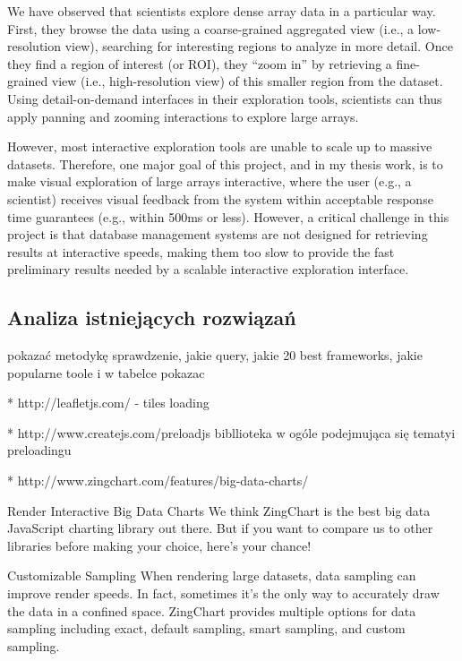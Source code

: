 We have observed that scientists explore dense array data in a particular way. First, they browse the data using a coarse-grained aggregated view (i.e., a low-resolution view), searching for interesting regions to analyze in more detail. Once they find a region of interest (or ROI), they “zoom in” by retrieving a fine-grained view (i.e., high-resolution view) of this smaller region from the dataset. Using detail-on-demand interfaces in their exploration tools, scientists can thus apply panning and zooming interactions to explore large arrays.

However, most interactive exploration tools are unable to scale up to massive datasets. Therefore, one major goal of this project, and in my thesis work, is to make visual exploration of large arrays interactive, where the user (e.g., a scientist) receives visual feedback from the system within acceptable response time guarantees (e.g., within 500ms or less). However, a critical challenge in this project is that database management systems are not designed for retrieving results at interactive speeds, making them too slow to provide the fast preliminary results needed by a scalable interactive exploration interface.



\subsection{Analiza istniejących rozwiązań}

pokazać metodykę sprawdzenie, jakie query, jakie 20 best frameworks, jakie popularne toole i w tabelce pokazac

* http://leafletjs.com/ - tiles loading

* http://www.createjs.com/preloadjs
bibllioteka w ogóle podejmująca się tematyi preloadingu

* http://www.zingchart.com/features/big-data-charts/

 Render Interactive Big Data Charts
 We think ZingChart is the best big data JavaScript charting library out there. But if you want to compare us to other libraries before making your choice, here’s your chance!

Customizable Sampling
When rendering large datasets, data sampling can improve render speeds. In fact, sometimes it's the only way to accurately draw the data in a confined space. ZingChart provides multiple options for data sampling including exact, default sampling, smart sampling, and custom sampling.

